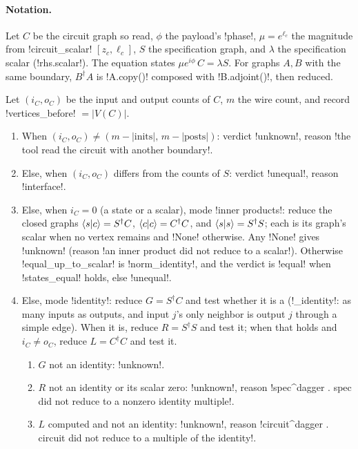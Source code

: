\paragraph{Notation.} Let $C$ be the circuit graph so read, $\phi$ the payload's \code!phase!, $\mu=e^{\ell_c}$ the magnitude from \code!circuit_scalar! $[z_c,\ell_c]$, $S$ the specification graph, and $\lambda$ the specification scalar (\code!rhs.scalar!). The equation states $\mu e^{i\phi}\,C=\lambda S$. For graphs $A,B$ with the same boundary, $B^\dagger A$ is \py!A.copy()! composed with \py!B.adjoint()!, then reduced.

\begin{algorithm}[ZX check]\label{alg:bench-tools-zx-check}
Let $(i_C,o_C)$ be the input and output counts of $C$, $m$ the wire count, and record \code!vertices_before! $=|V(C)|$.
\begin{enumerate}
\item When $(i_C,o_C)\neq(m-|\text{inits}|,\,m-|\text{posts}|)$: verdict \code!unknown!, reason \code!the tool read the circuit with another boundary!.
\item Else, when $(i_C,o_C)$ differs from the counts of $S$: verdict \code!unequal!, reason \code!interface!.
\item Else, when $i_C=0$ (a state or a scalar), mode \code!inner products!: reduce the closed graphs $\langle s \vert c \rangle=S^\dagger C$, $\langle c \vert c \rangle=C^\dagger C$, and $\langle s \vert s \rangle=S^\dagger S$; each is its graph's scalar when no vertex remains and \py!None! otherwise. Any \py!None! gives \code!unknown! (reason \code!an inner product did not reduce to a scalar!). Otherwise \code!equal_up_to_scalar! is \py!norm_identity!, and the verdict is \code!equal! when \py!states_equal! holds, else \code!unequal!.
\item Else, mode \code!identity!: reduce $G=S^\dagger C$ and test whether it is a  (\py!_identity!: as many inputs as outputs, and input $j$'s only neighbor is output $j$ through a simple edge). When it is, reduce $R=S^\dagger S$ and test it; when that holds and $i_C\neq o_C$, reduce $L=C^\dagger C$ and test it.
  \begin{enumerate}
  \item $G$ not an identity: \code!unknown!.
  \item $R$ not an identity or its scalar zero: \code!unknown!, reason \code!spec^dagger . spec did not reduce to a nonzero identity multiple!.
  \item $L$ computed and not an identity: \code!unknown!, reason \code!circuit^dagger . circuit did not reduce to a multiple of the identity!.

\end{enumerate}
\end{enumerate}
\end{algorithm}
